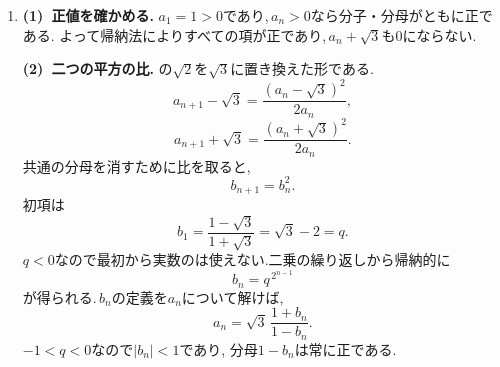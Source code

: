 \begin{enumerate}[label=\textbf{問\arabic*.},leftmargin=3.8em,format=\bookitemlink{practice-special}{solution}{problem}]
                \smallskip
                \textbf{(2)~正接の周期と角度の差.}
                4回進めると,
                \[
                  \theta_{n+4}-\theta_n=3\cdot2^{n-1}\pi.
                \]
                $\displaystyle \tan$の周期は$\displaystyle \pi$なので,\,$\displaystyle a_{n+4}=a_n$である.
                最初の四つの値は,
                \[
                  \tan\frac\pi5,\quad \tan\frac{2\pi}{5},\quad
                  -\tan\frac\pi5,\quad -\tan\frac{2\pi}{5}
                \]
                である.\,$\displaystyle 0<\frac\pi5<\frac{2\pi}{5}<\frac\pi2$で正接は狭義に増加するから,
                この四つは異なる.よって周期の最小値は$\displaystyle 4$である.
          \item \textbf{(1)~正値を確かめる.}
                $\displaystyle a_1=1>0$であり,\,$\displaystyle a_n>0$なら分子・分母がともに正である.
                よって帰納法によりすべての項が正であり,\,$\displaystyle a_n+\sqrt3$も$\displaystyle 0$にならない.

                \smallskip
                \textbf{(2)~二つの平方の比.}
                の$\displaystyle \sqrt2$を$\displaystyle \sqrt3$に置き換えた形である.
                \[
                  a_{n+1}-\sqrt3=\frac{(a_n-\sqrt3)^2}{2a_n},
                \]
                \[
                  a_{n+1}+\sqrt3=\frac{(a_n+\sqrt3)^2}{2a_n}.
                \]
                共通の分母を消すために比を取ると,
                \[
                  b_{n+1}=b_n^2.
                \]
                初項は
                \[
                  b_1=\frac{1-\sqrt3}{1+\sqrt3}=\sqrt3-2=q.
                \]
                $q<0$なので最初から実数のは使えない.二乗の繰り返しから帰納的に
                \[
                  b_n=q^{\,2^{n-1}}
                \]
                が得られる.\,$\displaystyle b_n$の定義を$\displaystyle a_n$について解けば,
                \[
                  a_n=\sqrt3\,\frac{1+b_n}{1-b_n}.
                \]
                $\displaystyle -1<q<0$なので$\displaystyle |b_n|<1$であり,
                分母$\displaystyle 1-b_n$は常に正である.


\end{enumerate}
